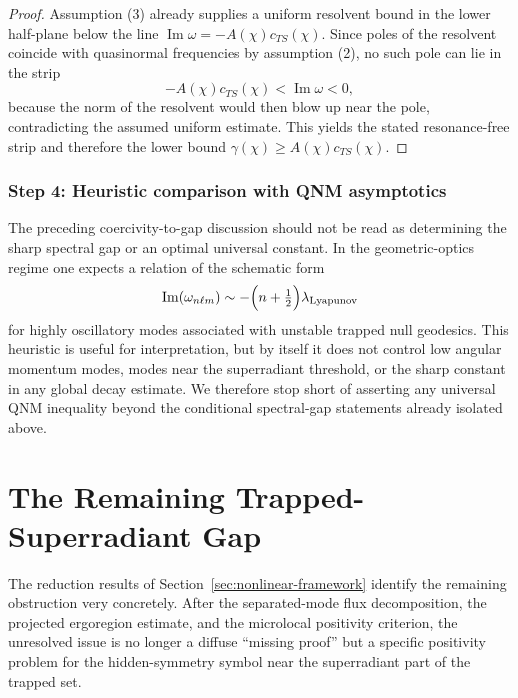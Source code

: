 \documentclass[12pt,a4paper]{article}
\begin{document}
\begin{proof}
Assumption (3) already supplies a uniform resolvent bound in the lower half-plane below the line $\operatorname{Im}\omega=-A(\chi)c_{TS}(\chi)$. Since poles of the resolvent coincide with quasinormal frequencies by assumption (2), no such pole can lie in the strip
\begin{equation}
-A(\chi)c_{TS}(\chi) < \operatorname{Im}\omega < 0,
\end{equation}
because the norm of the resolvent would then blow up near the pole, contradicting the assumed uniform estimate. This yields the stated resonance-free strip and therefore the lower bound $\gamma(\chi)\ge A(\chi)c_{TS}(\chi)$.
\end{proof}

\subsubsection{Step 4: Heuristic comparison with QNM asymptotics}

The preceding coercivity-to-gap discussion should not be read as determining the sharp spectral gap or an optimal universal constant. In the geometric-optics regime one expects a relation of the schematic form
\begin{equation}
\operatorname{Im}(\omega_{n\ell m}) \sim -\Bigl(n+\tfrac12\Bigr)\lambda_{\mathrm{Lyapunov}}
\end{equation}
for highly oscillatory modes associated with unstable trapped null geodesics. This heuristic is useful for interpretation, but by itself it does not control low angular momentum modes, modes near the superradiant threshold, or the sharp constant in any global decay estimate. We therefore stop short of asserting any universal QNM inequality beyond the conditional spectral-gap statements already isolated above.

\section{The Remaining Trapped-Superradiant Gap}
\label{sec:trapped-superradiant}

The reduction results of Section~\ref{sec:nonlinear-framework} identify the remaining obstruction very concretely. After the separated-mode flux decomposition, the projected ergoregion estimate, and the microlocal positivity criterion, the unresolved issue is no longer a diffuse ``missing proof'' but a specific positivity problem for the hidden-symmetry symbol near the superradiant part of the trapped set.
\end{document}
